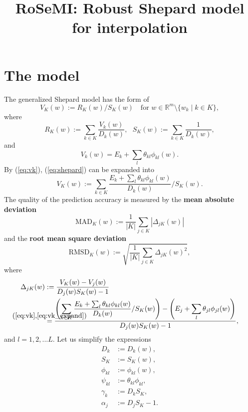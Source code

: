 \documentclass[12pt]{article}
\title{RoSeMI: Robust Shepard model for interpolation}
\newcommand{\defeq}[2]{\stackrel{\mathclap{\normalfont\mbox{#1}}}{#2}}
\def\D{\displaystyle}
\begin{document}
\maketitle


\section{The model}
The generalized Shepard model has the form of 
\begin{equation}
    \label{eq:shepard}
    V_K(w):=R_K(w)/S_K(w) ~~~ \text{ for } w \in \mathbb{R}^m \setminus \{w_k\mid k\in K \},
\end{equation}
where
\begin{equation}
    R_K(w):=\sum_{k\in K} \frac{V_k(w)}{D_k(w)},~~~
    S_K(w):=\sum_{k\in K} \frac{1}{D_k(w)},
\end{equation}
and
\begin{equation}
    \label{eq:vk}
    V_k(w) = E_k + \sum_l \theta_{kl} \phi_{kl}(w).
\end{equation}
By (\ref{eq:vk}), (\ref{eq:shepard}) can be expanded into
\begin{equation}
    \label{eq:vk_expand}
    V_K(w) := \sum_{k\in K} \frac{E_k + \sum_l \theta_{kl} \phi_{kl}(w)}{D_k(w)} / S_K(w). 
\end{equation}
The quality of the prediction accuracy is measured by the \textbf{mean absolute deviation}
\begin{equation}
    \text{MAD}_K(w) := \frac{1}{|K|}\sum_{j\in K}|\Delta_{jK}(w)|
\end{equation}
and the \textbf{root mean square deviation}
\begin{equation}
    \text{RMSD}_K(w) := \sqrt{\frac{1}{|K|}\sum_{j\in K}\Delta_{jK}(w)^2},
\end{equation}
where
\begin{equation}
    \label{eq:delta}
    \begin{split}
        \Delta_{jK}(w)&:=\D\frac{V_K(w)-V_j(w)}{D_j(w)S_K(w)-1} \\
        &\defeq{(\refeq{eq:vk},\refeq{eq:vk_expand})}{=} \frac{\D \left(\sum_{k\in K} \frac{E_k + \sum_l \theta_{kl} \phi_{kl}(w)}{D_k(w)} / S_K(w)\right) - \left(E_j + \sum_l \theta_{jl} \phi_{jl}(w)\right)}{D_j(w)S_K(w)-1}, \\
    \end{split}
\end{equation}
and $l=1,2,...L$.
Let us simplify the expressions
\begin{equation*}
	\label{eq:simp}
    \begin{split}
        D_k &:= D_k(w), \\
        S_K &:= S_K(w), \\
        \phi_{kl} &:= \phi_{kl}(w),\\
        \psi_{kl} &:= \theta_{kl}\phi_{kl}, \\
        \gamma_k &:= D_kS_K, \\
        \alpha_j &:= D_jS_K-1.
    \end{split}
\end{equation*}
\end{document}
